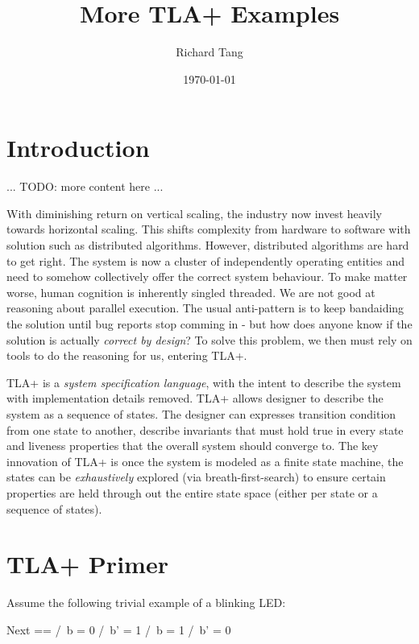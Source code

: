 \documentclass{report}
\title{More TLA+ Examples}
\author{Richard Tang}
\date{\today}
\begin{document}
\maketitle
\tableofcontents

\chapter{Introduction}

... TODO: more content here ... \newline

With diminishing return on vertical scaling, the industry now invest heavily
towards horizontal scaling. This shifts complexity from hardware to software
with solution such as distributed algorithms. However, distributed algorithms
are hard to get right. The system is now a cluster of independently operating
entities and need to somehow collectively offer the correct system behaviour. To
make matter worse, human cognition is inherently singled threaded. We are not
good at reasoning about parallel execution. The usual anti-pattern is to keep
bandaiding the solution until bug reports stop comming in - but how does anyone
know if the solution is actually \textit{correct by design}? To solve this
problem, we then must rely on tools to do the reasoning for us, entering TLA+.
\newline

TLA+ is a \textit{system specification language}, with the intent to describe
the system with implementation details removed. TLA+ allows designer to
describe the system as a sequence of states. The designer can expresses
transition condition from one state to another, describe invariants that must
hold true in every state and liveness properties that the overall system should
converge to. The key innovation of TLA+ is once the system is modeled as a
finite state machine, the states can be \textit{exhaustively} explored (via
breath-first-search) to ensure certain properties are held through out the
entire state space (either per state or a sequence of states).\newline

\chapter{TLA+ Primer}

Assume the following trivial example of a blinking LED:
\begin{tla}
    Next ==
    \/ /\ b = 0
       /\ b' = 1
    \/ /\ b = 1
       /\ b' = 0
\end{tla}
\begin{tlatex}
%
%
%
%
%
\end{tlatex}
\end{document}
